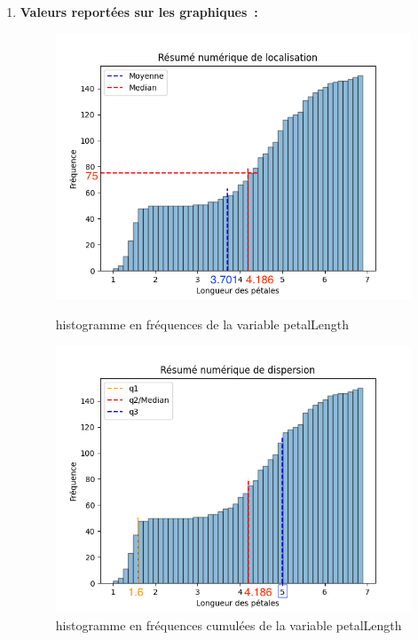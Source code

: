 \begin{enumerate}
    \item \textbf{Valeurs reportées sur les graphiques~:}
            \begin{figure}[!h]
                \centering
                \begin{minipage}{.48\linewidth}
                    \begin{center}
                        \includegraphics[width=1.1\textwidth]{img/Figure_6.png}
                        \caption{\label{fig:histogramme_freq-petalLength}histogramme en fréquences de la variable petalLength}  
                    \end{center}
                \end{minipage}\hfill
                \begin{minipage}{.48\linewidth}
                    \begin{center}
                        \includegraphics[width=1.1\textwidth]{img/Figure_7.png}
                        \caption{\label{fig:histogramme_freq-petalLength-cumul}histogramme en fréquences cumulées de la variable petalLength}  
                    \end{center}
                \end{minipage}
            \end{figure}
            

\end{enumerate}
